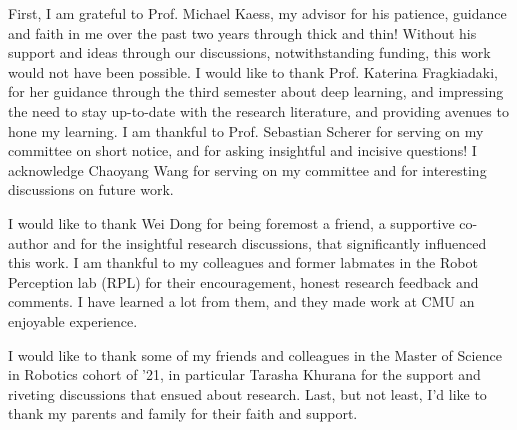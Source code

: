 
\setlength{\parskip}{1em}
\setlength{\parindent}{0em}

\noindent
First, I am grateful to Prof. Michael Kaess, my advisor for his patience, guidance and faith in me over the past two years through thick and thin! Without his support and ideas through our discussions, notwithstanding funding, this work would not have been possible. I would like to thank Prof. Katerina Fragkiadaki, for her guidance through the third semester about deep learning, and impressing the need to stay up-to-date  with the research literature, and providing avenues to hone my learning. I am thankful to Prof. Sebastian Scherer for serving on my committee on short notice, and for asking insightful and incisive questions! I acknowledge Chaoyang Wang for serving on my committee and for interesting discussions on future work.

I would like to thank Wei Dong for being foremost a friend, a supportive co-author and for the insightful research discussions, that significantly influenced this work. I am thankful to my colleagues and former labmates in the Robot Perception lab (RPL) for their encouragement, honest research feedback and comments. I have learned a lot from them, and they made work at CMU an enjoyable experience.

I would like to thank some of my friends and colleagues in the Master of Science in Robotics cohort of '21, in particular Tarasha Khurana for the support and riveting discussions that ensued about research. Last, but not least, I'd like to thank my parents and family for their faith and support.
